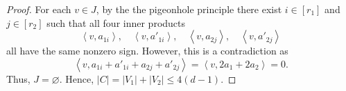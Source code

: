 \documentclass[reqno, 11pt]{amsart}
\theoremstyle{definition}
\theoremstyle{remark}
\newcommand{\ang}[1]{\left\langle #1 \right\rangle}
\begin{document}
\begin{proof}
    For each $ v \in J$, by the the pigeonhole principle there exist $i \in [r_1]$ and $j \in [r_2]$ such that all four inner products
\[
    \ang{v, a_{1i}}, \quad
    \ang{v, a'_{1i}}, \quad
    \ang{v, a_{2j}}, \quad
    \ang{v, a'_{2j}}
\]
all have the same nonzero sign. However, this is a contradiction as
\[
    \ang {v, a_{1i} + a'_{1i} + a_{2j} + a'_{2j} } = \ang {v, 2a_1+2a_2 } = 0.
\]
Thus, $J = \varnothing$. Hence, $|C| = |V_1| + |V_2| \leq 4(d-1)$. 
\end{proof}




\end{document}
